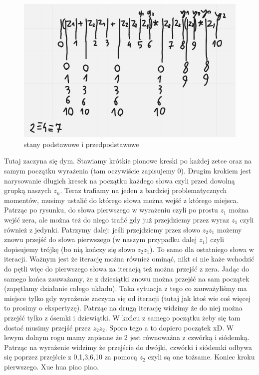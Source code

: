 \begin{figure}[h!]
    \centering
    \includegraphics[width=.7\textwidth]{images/regex/reg_pp1.png}
    \caption{stany podstawowe i przedpodstawowe}
    \label{fig:my_label}
\end{figure}

\newpage

Tutaj zaczyna się dym. Stawiamy krótkie pionowe kreski po każdej zetce oraz na samym początku wyrażenia (tam oczywiście zapisujemy 0). Drugim krokiem jest narysowanie długich kresek na początku każdego słowa czyli przed dowolną grupką naszych $z_n$. Teraz trafiamy na jeden z bardziej problematycznych momentów, musimy ustalić do którego słowa można wejść z którego miejsca. Patrząc po rysunku, do słowa pierwszego w wyrażeniu czyli po prostu $z_1$ można wejść zera, ale można też do niego trafić gdy już przejdziemy przez wyraz $z_1$ czyli również z jedynki. Patrzymy dalej: jeśli przejdziemy przez słowo $z_2z_1$ możemy znowu przejść do słowa pierwszego (w naszym przypadku dalej $z_1$) czyli dopisujemy trójkę (bo nią kończy się słowo $z_2z_1$). To samo dla ostatniego słowa w iteracji. Ważnym jest że iterację można również ominąć, nikt ci nie każe wchodzić do pętli więc do pierwszego słowa za iteracją też można przejść z zera.
Jadąc do samego końca zauważamy, że z dziesiątki znowu można przejść na sam początek (zapętlamy działanie całego układu). Taka sytuacja z tego co zauważyliśmy ma miejsce tylko gdy wyrażenie zaczyna się od iteracji (tutaj jak ktoś wie coś więcej to prosimy o ekspertyzę). Patrząc na drugą iterację widzimy że do niej można przejść tylko z ósemki i dziewiątki. W końcu z samego początku żeby się tam dostać musimy przejść przez $z_2z_2$. Sporo tego a to dopiero początek xD. W lewym dolnym rogu mamy zapisane że 2 jest równoważna z czwórką i siódemką. Patrząc na wyrażenie widzimy że przejście do dwójki, czwórki i siódemki odbywa się poprzez przejście z 0,1,3,6,10 za pomocą $z_2$ czyli są one tożsame. Koniec kroku pierwszego. Xue hua piao piao.


